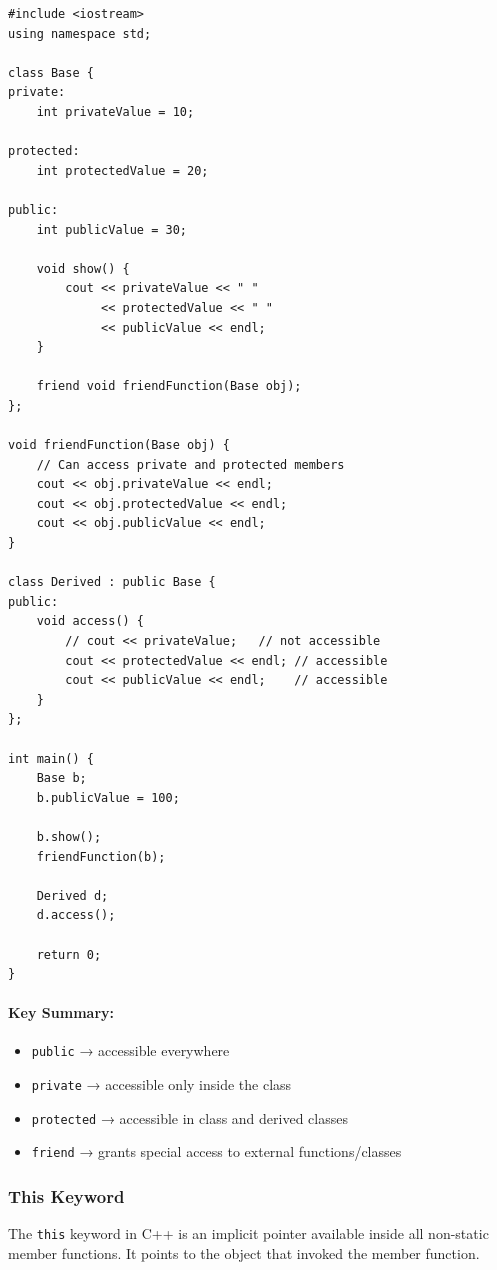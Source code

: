 \documentclass[10pt]{article}
\begin{document}
\begin{verbatim}
#include <iostream>
using namespace std;

class Base {
private:
    int privateValue = 10;

protected:
    int protectedValue = 20;

public:
    int publicValue = 30;

    void show() {
        cout << privateValue << " "
             << protectedValue << " "
             << publicValue << endl;
    }

    friend void friendFunction(Base obj);
};

void friendFunction(Base obj) {
    // Can access private and protected members
    cout << obj.privateValue << endl;
    cout << obj.protectedValue << endl;
    cout << obj.publicValue << endl;
}

class Derived : public Base {
public:
    void access() {
        // cout << privateValue;   // not accessible
        cout << protectedValue << endl; // accessible
        cout << publicValue << endl;    // accessible
    }
};

int main() {
    Base b;
    b.publicValue = 100;

    b.show();
    friendFunction(b);

    Derived d;
    d.access();

    return 0;
}
\end{verbatim}

\paragraph{Key Summary:}

\begin{itemize}
    \item \verb|public| → accessible everywhere
    \item \verb|private| → accessible only inside the class
    \item \verb|protected| → accessible in class and derived classes
    \item \verb|friend| → grants special access to external functions/classes
\end{itemize}

\newpage
\subsubsection{This Keyword}

The \verb|this| keyword in C++ is an implicit pointer available inside all non-static member functions. It points to the object that invoked the member function.
\end{document}
